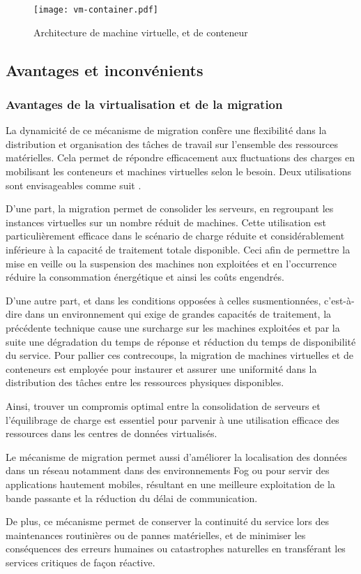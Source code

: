 \begin{figure}[H]
\centering
\texttt{[image: vm-container.pdf]}
\caption{Architecture de machine virtuelle, et de conteneur \cite{alibabacloud}}
\label{fig:vmvsconteneur}
\end{figure}

\subsection{Avantages et inconvénients}
\subsubsection{Avantages de la virtualisation et de la migration}
La dynamicité de ce mécanisme de migration confère une flexibilité dans la distribution et organisation des tâches de travail sur l'ensemble des ressources matérielles. Cela permet de répondre efficacement aux fluctuations des charges en mobilisant les conteneurs et machines virtuelles selon le besoin. Deux utilisations sont envisageables comme suit \cite{boutaba2013}.\par
D'une part, la migration permet de consolider les serveurs, en regroupant les instances virtuelles sur un nombre réduit de machines. Cette utilisation est particulièrement efficace dans le scénario de charge réduite et considérablement inférieure à la capacité de traitement totale disponible. Ceci afin de permettre la mise en veille ou la suspension des machines non exploitées et en l'occurrence réduire la consommation énergétique et ainsi les coûts engendrés.\par
D'une autre part, et dans les conditions opposées à celles susmentionnées, c'est-à-dire dans un environnement qui exige de grandes capacités de traitement, la précédente technique cause une surcharge sur les machines exploitées et par la suite une dégradation du temps de réponse et réduction du temps de disponibilité du service. Pour pallier ces contrecoups, la migration de machines virtuelles et de conteneurs est employée pour instaurer et assurer une uniformité dans la distribution des tâches entre les ressources physiques disponibles.\par
Ainsi, trouver un compromis optimal entre la consolidation de serveurs et l'équilibrage de charge est essentiel pour parvenir à une utilisation efficace des ressources dans les centres de données virtualisés.\par
Le mécanisme de migration permet aussi d'améliorer la localisation des données dans un réseau notamment dans des environnements Fog ou pour servir des applications hautement mobiles, résultant en une meilleure exploitation de la bande passante et la réduction du délai de communication.\par
De plus, ce mécanisme permet de conserver la continuité du service lors des maintenances routinières ou de pannes matérielles, et de minimiser les conséquences des erreurs humaines ou catastrophes naturelles en transférant les services critiques de façon réactive.

